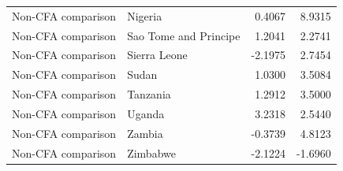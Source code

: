 \begin{table}
\begin{tabular}[t]{llrr}
Non-CFA comparison & Nigeria & 0.4067 & 8.9315\\
Non-CFA comparison & Sao Tome and Principe & 1.2041 & 2.2741\\
Non-CFA comparison & Sierra Leone & -2.1975 & 2.7454\\
\addlinespace
Non-CFA comparison & Sudan & 1.0300 & 3.5084\\
Non-CFA comparison & Tanzania & 1.2912 & 3.5000\\
Non-CFA comparison & Uganda & 3.2318 & 2.5440\\
Non-CFA comparison & Zambia & -0.3739 & 4.8123\\
Non-CFA comparison & Zimbabwe & -2.1224 & -1.6960\\
\bottomrule
\end{tabular}
\end{table}